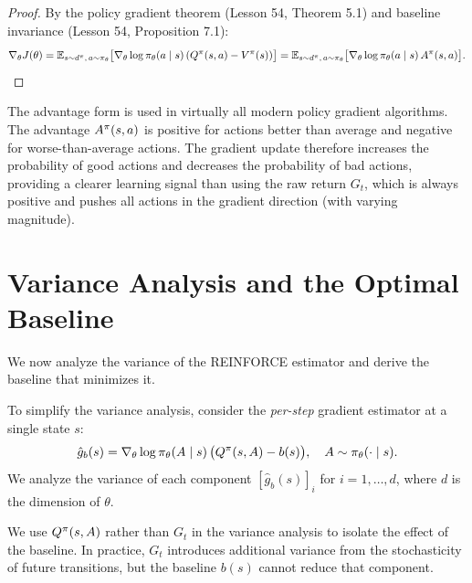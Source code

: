\documentclass[11pt,a4paper]{article}
\begin{document}
\begin{proof}
By the policy gradient theorem (Lesson 54, Theorem 5.1) and
baseline invariance (Lesson 54, Proposition 7.1):
\[
  \nabla_\theta J(\theta)
  = \mathbb{E}_{s \sim d^{\pi},\, a \sim \pi_\theta}
  \bigl[\nabla_\theta \log \pi_\theta(a \mid s)\,
  (Q^{\pi}(s,a) - V^{\pi}(s))\bigr]
  = \mathbb{E}_{s \sim d^{\pi},\, a \sim \pi_\theta}
  \bigl[\nabla_\theta \log \pi_\theta(a \mid s)\, A^{\pi}(s,a)
  \bigr]. \qedhere
\]
\end{proof}

\begin{rlconnection}
The advantage form is used in virtually all modern policy gradient
algorithms. The advantage $A^{\pi}(s,a)$ is positive for actions
better than average and negative for worse-than-average actions. The
gradient update therefore increases the probability of good actions
and decreases the probability of bad actions, providing a clearer
learning signal than using the raw return $G_t$, which is always
positive and pushes all actions in the gradient direction (with varying
magnitude).
\end{rlconnection}

\section{Variance Analysis and the Optimal Baseline}

We now analyze the variance of the REINFORCE estimator and derive the
baseline that minimizes it.

\begin{definition}
\label{def:per-step}
To simplify the variance analysis, consider the \emph{per-step} gradient
estimator at a single state $s$:
\[
  \hat{g}_b(s) = \nabla_\theta \log \pi_\theta(A \mid s)\,
  \bigl(Q^{\pi}(s,A) - b(s)\bigr), \quad A \sim \pi_\theta(\cdot \mid s).
\]
We analyze the variance of each component $[\hat{g}_b(s)]_i$ for
$i = 1, \ldots, d$, where $d$ is the dimension of $\theta$.
\end{definition}

\begin{remark}
We use $Q^{\pi}(s,A)$ rather than $G_t$ in the variance analysis to
isolate the effect of the baseline. In practice, $G_t$ introduces
additional variance from the stochasticity of future transitions, but the
baseline $b(s)$ cannot reduce that component.
\end{remark}
\end{document}
